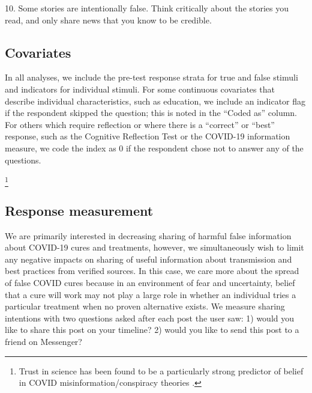 \documentclass[letterpaper, 12pt, parskip=full,DIV=10]{scrartcl}
\begin{document}
10. Some stories are intentionally false. Think critically about the stories you read, and only share news that you know to be credible.


\subsection{Covariates}
\label{section:covariates}

In all analyses, we include the pre-test response strata for true and false stimuli and indicators for individual stimuli. For some continuous covariates that describe individual characteristics, such as education, we include an indicator flag if the respondent skipped the question; this is noted in the ``Coded as'' column. For others which require reflection or where there is a ``correct'' or ``best'' response, such as the Cognitive Reflection Test or the COVID-19 information measure, we code the index as 0 if the respondent chose not to answer any of the questions. 


\footnote{%
Trust in science has been found to be a particularly strong predictor of belief in COVID misinformation/conspiracy theories \citep{murphy2021psychological}.
}



\subsection{Response measurement}

We  are  primarily  interested  in  decreasing  sharing  of  harmful  false  information  about COVID-19 cures and treatments, however, we simultaneously wish to limit any negative impacts on sharing of useful information about transmission and best practices from verified sources.  In this case,  we care more about the spread of false COVID cures because in an environment of fear and uncertainty, belief that a cure will work may not play a large role in whether an individual tries a particular treatment when no proven alternative exists. We measure sharing intentions with two questions asked after each post the user saw: 1) would you like to share this post on your timeline? 2) would you like to send this post to a friend on Messenger? 
\end{document}
